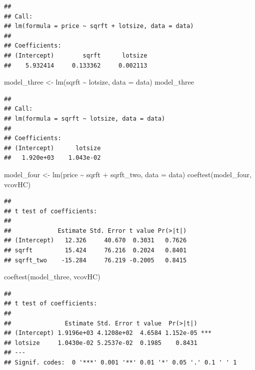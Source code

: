 \documentclass[
]{book}
\newenvironment{Shaded}{\begin{snugshade}}{\end{snugshade}}
\newcommand{\AttributeTok}[1]{\textcolor[rgb]{0.77,0.63,0.00}{#1}}
\newcommand{\FunctionTok}[1]{\textcolor[rgb]{0.00,0.00,0.00}{#1}}
\newcommand{\NormalTok}[1]{#1}
\newcommand{\OtherTok}[1]{\textcolor[rgb]{0.56,0.35,0.01}{#1}}
\newcommand{\SpecialCharTok}[1]{\textcolor[rgb]{0.00,0.00,0.00}{#1}}
\theoremstyle{definition}
\theoremstyle{definition}
\theoremstyle{definition}
\theoremstyle{definition}
\theoremstyle{remark}
\begin{document}
\begin{verbatim}
## 
## Call:
## lm(formula = price ~ sqrft + lotsize, data = data)
## 
## Coefficients:
## (Intercept)        sqrft      lotsize  
##    5.932414     0.133362     0.002113
\end{verbatim}

\begin{Shaded}
\begin{Highlighting}[]
\NormalTok{model\_three }\OtherTok{\textless{}{-}} \FunctionTok{lm}\NormalTok{(sqrft }\SpecialCharTok{\textasciitilde{}}\NormalTok{ lotsize, }\AttributeTok{data =}\NormalTok{ data)}
\NormalTok{model\_three}
\end{Highlighting}
\end{Shaded}

\begin{verbatim}
## 
## Call:
## lm(formula = sqrft ~ lotsize, data = data)
## 
## Coefficients:
## (Intercept)      lotsize  
##   1.920e+03    1.043e-02
\end{verbatim}

\begin{Shaded}
\begin{Highlighting}[]
\NormalTok{model\_four }\OtherTok{\textless{}{-}} \FunctionTok{lm}\NormalTok{(price }\SpecialCharTok{\textasciitilde{}}\NormalTok{ sqrft }\SpecialCharTok{+}\NormalTok{ sqrft\_two, }\AttributeTok{data =}\NormalTok{ data)}
\FunctionTok{coeftest}\NormalTok{(model\_four, vcovHC)}
\end{Highlighting}
\end{Shaded}

\begin{verbatim}
## 
## t test of coefficients:
## 
##             Estimate Std. Error t value Pr(>|t|)
## (Intercept)   12.326     40.670  0.3031   0.7626
## sqrft         15.424     76.216  0.2024   0.8401
## sqrft_two    -15.284     76.219 -0.2005   0.8415
\end{verbatim}

\begin{Shaded}
\begin{Highlighting}[]
\FunctionTok{coeftest}\NormalTok{(model\_three, vcovHC)}
\end{Highlighting}
\end{Shaded}

\begin{verbatim}
## 
## t test of coefficients:
## 
##               Estimate Std. Error t value  Pr(>|t|)    
## (Intercept) 1.9196e+03 4.1208e+02  4.6584 1.152e-05 ***
## lotsize     1.0430e-02 5.2537e-02  0.1985    0.8431    
## ---
## Signif. codes:  0 '***' 0.001 '**' 0.01 '*' 0.05 '.' 0.1 ' ' 1
\end{verbatim}
\end{document}
